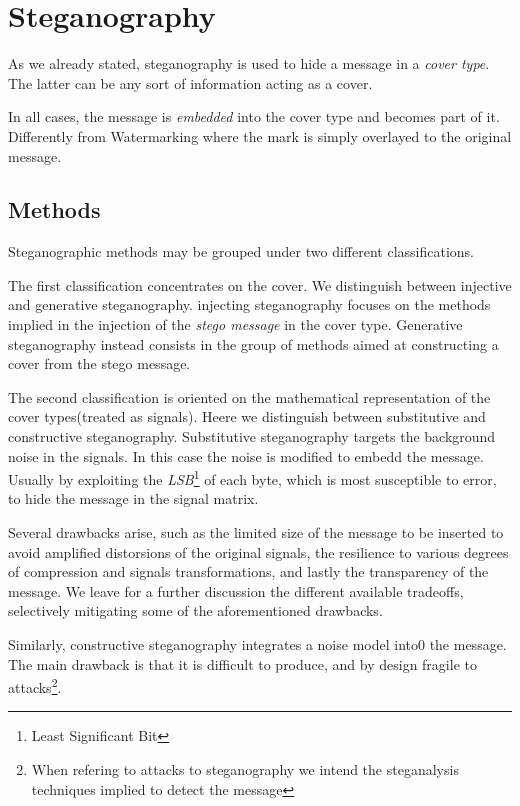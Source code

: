 \documentclass[../../main.tex]{subfiles}
\begin{document}
\section{Steganography}

As we already stated, steganography is used to hide a message in a
\emph{cover type}. The latter can be any sort of information acting as a cover.

In all cases, the message is \emph{embedded} into the cover type and becomes part of it. Differently from
Watermarking where the mark is simply overlayed to the original message.

\subsection{Methods}

Steganographic methods may be grouped under two different classifications.

The first classification concentrates on the cover. We distinguish between injective and generative steganography.
injecting steganography focuses on the methods implied in the injection of the \emph{stego message} in the cover type.
Generative steganography instead consists in the group of methods aimed at constructing a cover from the stego message.

The second classification is oriented on the mathematical representation of the cover types(treated as signals). Heere we distinguish between 
substitutive and constructive steganography.
Substitutive steganography targets the background noise in the signals. In this case the noise is modified to embedd the message.
Usually by exploiting the \emph{LSB}\footnote{Least Significant Bit} of each byte,
which is most susceptible to error, to hide the message in the signal matrix.

Several drawbacks arise, such as the limited size of the message to be inserted
to avoid amplified distorsions of the original signals, the resilience to
various degrees of compression and signals transformations, and lastly the
transparency of the message.
We leave for a further discussion the different available tradeoffs, selectively
mitigating some of the aforementioned drawbacks. 

Similarly, constructive steganography integrates a noise model into0 the message.
The main drawback is that it is difficult to produce, and by design fragile to
attacks\footnote{When refering to attacks to steganography we intend the steganalysis techniques implied to detect the message}.
\end{document}
